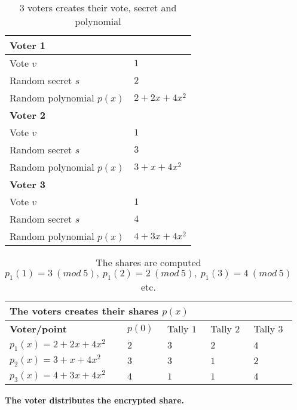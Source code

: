\begin{table}[H]
\centering
\begin{tabular}{|l|l|}
\hline
\multicolumn{2}{|l|}{\textbf{Voter 1}}        \\ \hline
Vote $v$          & $1$                         \\ \hline
Random secret $s$ & $2$                         \\ \hline
Random polynomial $p(x)$ & $2+2x+4x^2$ \\ \hline
\multicolumn{2}{|l|}{\textbf{Voter 2}}        \\ \hline
Vote $v$          & $1$                         \\ \hline
Random secret $s$ & $3$                         \\ \hline
Random polynomial $p(x)$ & $3+x+4x^2$ \\ \hline
\multicolumn{2}{|l|}{\textbf{Voter 3}}        \\ \hline
Vote $v$          & $1$                         \\ \hline
Random secret $s$ & $4$                         \\ \hline
Random polynomial $p(x)$ & $4+3x+4x^2$ \\ \hline
\end{tabular}
\caption{3 voters creates their vote, secret and polynomial}
\label{my-label}
\end{table}


\begin{table}[H]
\centering
\begin{tabular}{|l|l|l|l|l|}
\hline
\multicolumn{5}{|l|}{\textbf{The voters creates their shares $p(x)$}}                                    \\ \hline
\textbf{Voter/point}            & $p(0)$ & Tally $1$ & Tally $2$ & Tally $3$ \\ \hline
$p_1(x)= 2+2x+4x^2$ &  $2$    & $3$         & $2$         & $4$         \\ \hline
$p_2(x)= 3+x+4x^2$  &  $3$    & $3$         & $1$         & $2$         \\ \hline
$p_3(x)= 4+3x+4x^2$ &  $4$    & $1$         & $1$         & $4$         \\ \hline
\end{tabular}
\caption{The shares are computed $p_1(1)=3 \ (mod \ 5),\ p_1(2)=2 \ (mod \ 5),\ p_1(3)=4 \ (mod \ 5)$ etc.}
\label{my-label}
\end{table}

\noindent
\textbf{The voter distributes the encrypted share.}

